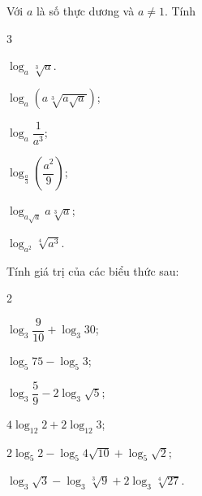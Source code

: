 \begin{vd}
	Với $a$ là số thực dương và $a \ne 1$. Tính
	\begin{enumEX}[a)]{3}
		\item $\log_a\sqrt[3]{a}$.
		\item $\log_a\left( a\sqrt[3]{a\sqrt{a}}\right)$;
		\item $\log_a\dfrac{1}{a^3}$;
		\item $\log_{\tfrac{a}{3}}\left(\dfrac{a^2}{9}\right)$;
		\item $\log_{a\sqrt{a}}{a\sqrt[3]{a}}$;
		\item $\log_{a^2} \sqrt[4]{a^3}$.
	\end{enumEX}
	\loigiai{}
\end{vd} 

\begin{vd}%
	Tính giá trị của các biểu thức sau:
	\begin{enumEX}[a)]{2}
		\item $\log _{3} \dfrac{9}{10}+\log _{3} 30$;
		\item $\log _{5} 75-\log _{5} 3$;
		\item $\log _{3} \dfrac{5}{9}-2 \log _{3} \sqrt{5}$;
		\item $4 \log _{12} 2+2 \log _{12} 3$;
		\item $2 \log _{5} 2-\log _{5} 4 \sqrt{10}+\log _{5} \sqrt{2}$;
		\item $\log _{3} \sqrt{3}-\log _{3} \sqrt[3]{9}+2 \log _{3} \sqrt[4]{27}$.
	\end{enumEX} 
\end{vd}
